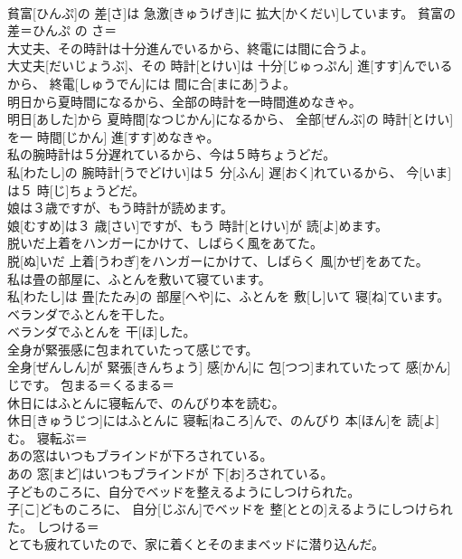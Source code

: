 \documentclass[8pt]{extreport}
\begin{document}
\begin{CJK}{UTF8}{min}
\\	貧富[ひんぷ]の 差[さ]は 急激[きゅうげき]に 拡大[かくだい]しています。	貧富の差＝ひんぷ の さ＝ 
\\	大丈夫、その時計は十分進んでいるから、終電には間に合うよ。	
\\	大丈夫[だいじょうぶ]、その 時計[とけい]は 十分[じゅっぷん] 進[すす]んでいるから、 終電[しゅうでん]には 間に合[まにあ]うよ。	
\\	明日から夏時間になるから、全部の時計を一時間進めなきゃ。	
\\	明日[あした]から 夏時間[なつじかん]になるから、 全部[ぜんぶ]の 時計[とけい]を一 時間[じかん] 進[すす]めなきゃ。	
\\	私の腕時計は５分遅れているから、今は５時ちょうどだ。	
\\	私[わたし]の 腕時計[うでどけい]は５ 分[ふん] 遅[おく]れているから、 今[いま]は５ 時[じ]ちょうどだ。	
\\	娘は３歳ですが、もう時計が読めます。	
\\	娘[むすめ]は３ 歳[さい]ですが、もう 時計[とけい]が 読[よ]めます。	
\\	脱いだ上着をハンガーにかけて、しばらく風をあてた。	
\\	脱[ぬ]いだ 上着[うわぎ]をハンガーにかけて、しばらく 風[かぜ]をあてた。	
\\	私は畳の部屋に、ふとんを敷いて寝ています。	
\\	私[わたし]は 畳[たたみ]の 部屋[へや]に、ふとんを 敷[し]いて 寝[ね]ています。	
\\	ベランダでふとんを干した。	
\\	ベランダでふとんを 干[ほ]した。	
\\	全身が緊張感に包まれていたって感じです。	
\\	全身[ぜんしん]が 緊張[きんちょう] 感[かん]に 包[つつ]まれていたって 感[かん]じです。	包まる＝くるまる＝ 
\\	休日にはふとんに寝転んで、のんびり本を読む。	
\\	休日[きゅうじつ]にはふとんに 寝転[ねころ]んで、のんびり 本[ほん]を 読[よ]む。	寝転ぶ＝ 
\\	あの窓はいつもブラインドが下ろされている。	
\\	あの 窓[まど]はいつもブラインドが 下[お]ろされている。	
\\	子どものころに、自分でベッドを整えるようにしつけられた。	
\\	子[こ]どものころに、 自分[じぶん]でベッドを 整[ととの]えるようにしつけられた。	しつける＝ 
\\	とても疲れていたので、家に着くとそのままベッドに潜り込んだ。	

\end{CJK}
\end{document}
